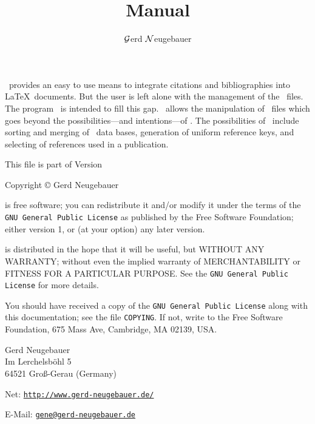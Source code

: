 \documentclass[11pt,a4paper]{scrbook}
\newenvironment{Disclaimer}{\begin{center}\sffamily\tiny --- }{ ---\end{center}}
\newcommand\LINK[2]{\texttt{#2}}
\newcommand\Link[2]{\href{#1}{\texttt{#2}}}
\newcommand\email[1]{\href{mailto:#1}{\texttt{#1}}}
\begin{document}

\title{\BibTool{} Manual}
\author{\(\cal G\)\hspace{-.1em}erd \(\cal N\)\hspace{-.2em}eugebauer}
\maketitle

\begin{Abstract}
  \BibTeX\ provides an easy to use means to integrate citations and
  bibliographies into \LaTeX\ documents. But the user is left alone with the
  management of the \BibTeX\ files. The program \BibTool\ is intended to fill
  this gap. \BibTool\ allows the manipulation of \BibTeX\ files which goes
  beyond the possibilities---and intentions---of \BibTeX. The
  possibilities of \BibTool\ include sorting and merging of \BibTeX\ data
  bases, generation of uniform reference keys, and selecting of references
  used in a publication.
\end{Abstract}

\newpage
\begingroup\setlength\parskip{1ex}\setlength\parindent{0pt}
This file is part of \BibTool{} Version \Version
\medskip\par

Copyright \copyright{} \Year{} Gerd Neugebauer
\medskip\par

\BibTool{} is free software; you can redistribute it and/or modify it under
the terms of the \LINK{GPL.html}{GNU General Public License} as published by
the Free Software Foundation; either version 1, or (at your option) any later
version.

\BibTool{} is distributed in the hope that it will be useful, but WITHOUT ANY
WARRANTY; without even the implied warranty of MERCHANTABILITY or FITNESS FOR
A PARTICULAR PURPOSE.  See the \LINK{GPL.html}{GNU General Public License} for
more details.

You should have received a copy of the \LINK{GPL.html}{GNU General Public
  License} along with this documentation; see the file
\LINK{GPL.html}{COPYING}.  If not, write to the Free Software Foundation, 675
Mass Ave, Cambridge, MA 02139, USA.
\vfill\par
Gerd Neugebauer\\
Im Lerchelsb\"ohl 5\\
64521 Gro\ss-Gerau (Germany)\par\noindent
Net: \Link{http://www.gerd-neugebauer.de/}{http://www.gerd-neugebauer.de/}
\par\noindent
E-Mail: \email{gene@gerd-neugebauer.de}
\endgroup
\tableofcontents
\end{document}
